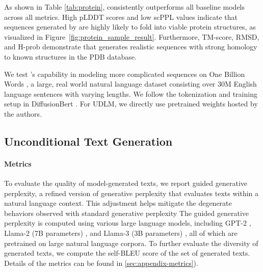 As shown in Table \ref{tab:protein}, \method{} consistently outperforms all baseline models across all metrics. High pLDDT scores and low scPPL values indicate that sequences generated by \method{} are highly likely to fold into viable protein structures, as visualized in Figure~\ref{fig:protein_sample_result}. Furthermore, TM-score, RMSD, and H-prob demonstrate that \method{} generates realistic sequences with strong homology to known structures in the PDB database.


We test \method{}'s capability in modeling more complicated sequences on One Billion Words \cite{chelba2014billionwordbenchmarkmeasuring}, a large, real world natural language dataset consisting over 30M English language sentences with varying lengths. We follow the tokenization and training setup in DiffusionBert 
\citep{he2022diffusionbertimprovinggenerativemasked}. For UDLM, we directly use pretrained weights hosted by the authors.

\subsection{Unconditional Text Generation}
\paragraph{Metrics}
To evaluate the quality of model-generated texts, we report {guided generative perplexity}, a refined version of generative perplexity that evaluates texts within a natural language context. This adjustment helps mitigate the degenerate behaviors observed with standard generative perplexity \citep{holtzman2020curiouscaseneuraltext} The guided generative perplexity is computed using various large language models, including GPT-2 \citep{radford2019language}, Llama-2 (7B parameters) \citep{touvron2023llama2openfoundation}, and Llama-3 (3B parameters) \citep{dubey2024llama}, all of which are pretrained on large natural language corpora. To further evaluate the diversity of generated texts, we compute the self-BLEU \citep{zhu2018texygenbenchmarkingplatformtext} score of the set of generated texts. Details of the metrics can be found in \ref{sec:appendix-metrics}).

